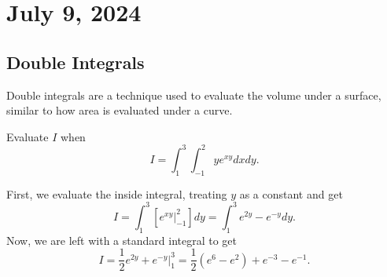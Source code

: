 \chapter{July 9, 2024}

\section{Double Integrals}

Double integrals are a technique used to evaluate the volume under a surface, similar to how area is evaluated under a curve.

\begin{example}
    Evaluate $I$ when
    \[I = \int_{1}^{3}\int_{-1}^{2}ye^{xy}dxdy.\]

    \begin{soln}
        First, we evaluate the inside integral, treating $y$ as a constant and get
        \[I = \int_{1}^{3}\left[e^{xy}\biggr\rvert_{-1}^{2}\right]dy = \int_{1}^{3}e^{2y} - e^{-y}dy.\]
        Now, we are left with a standard integral to get
        \[I = \frac{1}{2}e^{2y} + e^{-y}\biggr\rvert_{1}^{3} = \frac{1}{2}\left(e^{6} - e^{2}\right) + e^{-3} - e^{-1}.\]
    \end{soln}
\end{example}